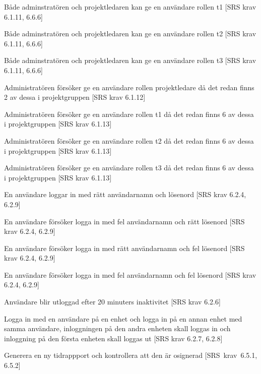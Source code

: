 \documentclass[a4paper]{article}
\begin{document}
\begin{appendices}
\begin{FT}
\item
Både adminstratören och projektledaren kan ge en användare rollen t1 [SRS krav 6.1.11, 6.6.6]

\item
Både adminstratören och projektledaren kan ge en användare rollen t2 [SRS krav 6.1.11, 6.6.6]

\item
Både adminstratören och projektledaren kan ge en användare rollen t3 [SRS krav 6.1.11, 6.6.6]

\item
Administratören försöker ge en användare rollen projektledare då det redan finns 2 av dessa i projektgruppen [SRS krav 6.1.12]

Administratören försöker ge en användare rollen t1 då det redan finns 6 av dessa i projektgruppen [SRS krav 6.1.13]

\item
Administratören försöker ge en användare rollen t2 då det redan finns 6 av dessa i projektgruppen [SRS krav 6.1.13]

\item
Administratören försöker ge en användare rollen t3 då det redan finns 6 av dessa i projektgruppen [SRS krav 6.1.13]

\item
En användare loggar in med rätt användarnamn och lösenord [SRS krav 6.2.4, 6.2.9]

\item
En användare försöker logga in med fel användarnamn och rätt lösenord [SRS krav 6.2.4, 6.2.9]

\item
En användare försöker logga in med rätt användarnamn och fel lösenord [SRS krav 6.2.4, 6.2.9]

\item
En användare försöker logga in med fel användarnamn och fel lösenord [SRS krav 6.2.4, 6.2.9]

\item 
Användare blir utloggad efter 20 minuters inaktivitet [SRS krav 6.2.6]

\item 
Logga in med en användare på en enhet och logga in på en annan enhet med samma användare, inloggningen på den andra enheten skall loggas in och inloggning på den första enheten skall loggas ut [SRS krav 6.2.7, 6.2.8]


\item
Generera en ny tidrappport och kontrollera att den är osignerad [SRS~krav~6.5.1, 6.5.2]


\end{FT}
\end{appendices}
\end{document}
